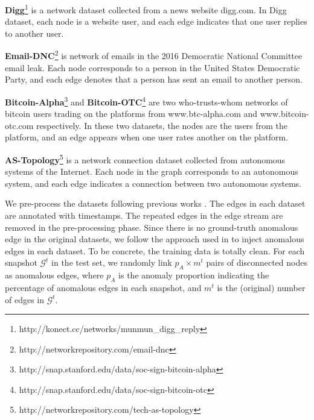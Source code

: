 \documentclass[10pt,journal,compsoc]{IEEEtran}
\newcommand{\HL}{}
\begin{document}
\textbf{Digg}\footnote{http://konect.cc/networks/munmun\_digg\_reply} \cite{de2009social} is a network dataset collected from a news website digg.com. In Digg dataset, each node is a website user, and each edge indicates that one user replies to another user. 

\HL{\textbf{Email-DNC}\footnote{http://networkrepository.com/email-dnc} \cite{nr} is network of emails in the 2016 Democratic National Committee email leak. Each node corresponds to a person in the United States Democratic Party, and each edge denotes that a person has sent an email to another person.}

\textbf{Bitcoin-Alpha}\footnote{http://snap.stanford.edu/data/soc-sign-bitcoin-alpha} and \textbf{Bitcoin-OTC}\footnote{http://snap.stanford.edu/data/soc-sign-bitcoin-otc} \cite{kumar2016edge,kumar2018rev2} are two who-trusts-whom networks of bitcoin users trading on the platforms from www.btc-alpha.com and www.bitcoin-otc.com respectively. In these two datasets, the nodes are the users from the platform, and an edge appears when one user rates another on the platform.

\HL{\textbf{AS-Topology}\footnote{http://networkrepository.com/tech-as-topology} \cite{zhang2005collecting} is a network connection dataset collected from autonomous systems of the Internet. Each node in the graph corresponds to an autonomous system, and each edge indicates a connection between two autonomous systems.}

We pre-process the datasets following previous works \cite{yu2018netwalk,zheng2019addgraph}. The edges in each dataset are annotated with timestamps. The repeated edges in the edge stream are removed in the pre-processing phase. Since there is no ground-truth anomalous edge in the original datasets, we follow the approach used in \cite{yu2018netwalk} to inject anomalous edges in each dataset. \HL{To be concrete, the training data is totally clean. For each snapshot $\mathcal{G}^t$ in the test set, we randomly link $p_A \times m^t$ pairs of disconnected nodes as anomalous edges, where $p_A$ is the anomaly proportion indicating the percentage of anomalous edges in each snapshot, and $m^t$ is the (original) number of edges in $\mathcal{G}^t$.}
\end{document}
